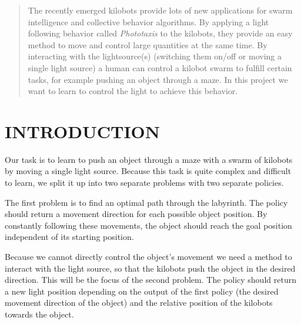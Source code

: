 \documentclass[twoside]{article}
\begin{document}

\begin{abstract}
The recently emerged kilobots provide lots of new applications for swarm
intelligence and collective behavior algorithms. By applying a light following
behavior called \emph{Phototaxis} to the kilobots, they provide an easy method
to move and control large quantities at the same time. By interacting with the
lightsource(s) (switching them on/off or moving a single light source) a human
can control a kilobot swarm to fulfill certain tasks, for example pushing an
object through a maze\cite{kilobotMaze}. In this project we want to learn to
control the light to achieve this behavior.
\end{abstract}

\section{INTRODUCTION}

Our task is to learn to push an object through a maze with a swarm of kilobots
by moving a single light source. Because this task is quite complex and
difficult to learn, we split it up into two separate problems with two separate
policies.

The first problem is to find an optimal path through the labyrinth.
The policy should return a movement direction for each possible object position.
By constantly following these movements, the object should reach the goal
position independent of its starting position.

Because we cannot directly
control the object's movement we need a method to interact with the light
source, so that the kilobots push the object in the desired direction. This will
be the focus of the second problem. The policy should return a new light
position depending on the output of the first policy (the desired movement
direction of the object) and the relative position of the kilobots towards the
object.
\end{document}
